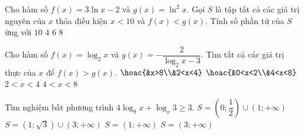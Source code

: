 \begin{ex}%
	Cho hàm số $f(x)=3\ln x-2$ và $g(x)=\ln^2x$. Gọi $S$ là tập tất cả các giá trị nguyên của $x$ thỏa điều kiện $x<10$ và $f(x)<g(x)$. Tính số phần tử của $S$ ứng với
	\choice
	{$10$}
	{\True $4$}
	{$6$}
	{$8$}
\end{ex}
\begin{ex}%
	Cho hàm số $f(x)=\log_2x$ và $g(x)=-\dfrac{2}{\log_2x-3}$. Tìm tất cả các giá trị thực của $x$ để $f(x)>g(x)$. 
	\choice
	{\True $\hoac{&x>8\\&2<x<4}$}
	{$\hoac{&0<x<2\\&4<x<8}$}
	{$2<x<4$}
	{$4<x<8$}
\end{ex}
\begin{ex}%
	Tìm nghiệm bất phương trình $4\log_9x+\log_x3\geq 3$. 
	\choice
	{$S=\left(0;\dfrac{1}{2}\right)\cup(1;+\infty)$}
	{\True $S=(1;\sqrt{3})\cup(3;+\infty)$}
	{$S=(1;+\infty)$}
	{$S=(3;+\infty)$}
\end{ex}
